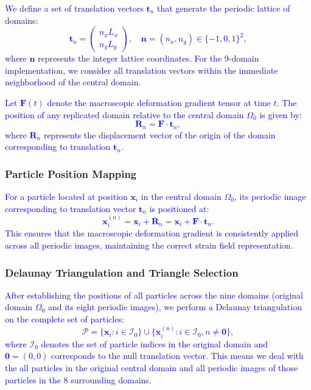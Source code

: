 \documentclass[aps,
superscriptaddress,notitlepage]{revtex4-1}
\begin{document}
\textcolor{blue}{We define a set of translation vectors $\mathbf{t}_n$ that generate the periodic lattice of domains:
$$\mathbf{t}_n = \begin{pmatrix} n_x L_x \\ n_y L_y \end{pmatrix}, \quad \mathbf{n} = (n_x, n_y) \in \{-1, 0, 1\}^2,$$
where $\mathbf{n}$ represents the integer lattice coordinates. For the 9-domain implementation, we consider all translation vectors within the immediate neighborhood of the central domain.}

\textcolor{blue}{Let $\mathbf{F}(t)$ denote the macroscopic deformation gradient tensor at time $t$. The position of any replicated domain relative to the central domain $\Omega_0$ is given by:
$$\mathbf{R}_n = \mathbf{F} \cdot \mathbf{t}_n,$$
where $\mathbf{R}_n$ represents the displacement vector of the origin of the domain corresponding to translation $\mathbf{t}_n$.}

\subsubsection{Particle Position Mapping}

\textcolor{blue}{For a particle located at position $\mathbf{x}_i$ in the central domain $\Omega_0$, its periodic image corresponding to translation vector $\mathbf{t}_n$ is positioned at:
$$\mathbf{x}_i^{(n)} = \mathbf{x}_i + \mathbf{R}_n = \mathbf{x}_i + \mathbf{F} \cdot \mathbf{t}_n.$$
This ensures that the macroscopic deformation gradient is consistently applied across all periodic images, maintaining the correct strain field representation.}

\subsubsection{Delaunay Triangulation and Triangle Selection}

\textcolor{blue}{After establishing the positions of all particles across the nine domains (original domain $\Omega_0$ and its eight periodic images), we perform a Delaunay triangulation on the complete set of particles:
$$\mathcal{P} = \{\mathbf{x}_i : i \in \mathcal{I}_0\} \cup \{\mathbf{x}_i^{(n)} : i \in \mathcal{I}_0, n \neq \mathbf{0}\},$$
where $\mathcal{I}_0$ denotes the set of particle indices in the original domain and $\mathbf{0} = (0,0)$ corresponds to the null translation vector. This means we deal with the all particles in the original central domain
and all periodic images of those particles in the 8 surrounding domains.}
\end{document}

